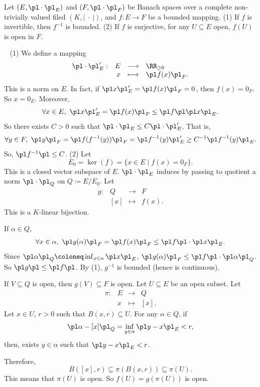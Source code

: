 \begin{propositionenv}
    Let $(E,\pl\cdot\pl_E)$ and $(F,\pl\cdot\pl_F)$ be Banach spaces over a complete non-trivially valued filed $(K,\left|\ \cdot\ \right|)$, and $f:E\longrightarrow F$ be a bounded mapping.
    \newline
    (1) If $f$ is invertible, then $f^{-1}$ is bounded.
    \newline
    (2) If $f$ is surjective, for any $U\subseteq E$ open, $f(U)$ is open in $F$.
\end{propositionenv}
\begin{proofenv}
    \ \newline
    (1) We define a mapping 
    $$\begin{array}{rrcl}
        \pl\cdot\pl_E':& E&\longrightarrow& \RR_{\ge 0}\\
        & x&\longmapsto& \pl f(x)\pl_{F}.
    \end{array}$$
    This is a norm on $E$. In fact, if $\pl x\pl_E'=\pl f(x)\pl_F=0$, then $f(x)=0_F$. So $x=0_E$. Moreover, 
    $$\forall x\in E,\ \pl x\pl'_E=\pl f(x)\pl_F\le \pl f\pl \pl x\pl_E.$$
    So there exists $C>0$ such that $\pl\cdot\pl_E\le C\pl \cdot\pl'_E$. That is, 
    $$ \forall y\in F,\ \pl y\pl_F=\pl f(f^{-1}(y))\pl_F=\pl f^{-1}(y)\pl'_E\ge C^{-1}\pl f^{-1}(y)\pl_E.$$
    So, $\pl f^{-1}\pl \le C$.
    \newline
    (2) Let 
    $$ E_0=\ker(f)=\{x\in E\mid f(x)=0_F\}.$$
    This is a closed vector subspace of $E$. 
    $\pl\cdot\pl_E$ induces by passing to quotient a norm $\pl\cdot\pl_Q$ on $Q\coloneq E/E_0$.
    Let 
    $$\begin{array}{rrcl}
        g:& Q&\longrightarrow& F\\
        &[x]&\longmapsto & f(x).
    \end{array} $$
    This is a $K$-linear bijection.

    \quad If $\alpha \in Q$, 
    $$\forall x\in \alpha,\ \pl g(\alpha)\pl_F=\pl f(x)\pl_F\le \pl f\pl \cdot\pl x\pl_E. $$
    Since $\pl \alpha\pl_Q\coloneq \inf_{x\in \alpha}\pl x\pl_E$, $\pl g(\alpha)\pl_F\le \pl f\pl\cdot\pl \alpha\pl_Q$.
    So $\pl g \pl\le \pl f\pl$. By (1), $g^{-1}$ is bounded (hence is continuous).

    \quad If $V\subseteq Q$ is open, then $g(V)\subseteq F$ is open. 
    Let $U\subseteq E$ be an open subset. Let 
    $$\begin{array}{rrcl}
        \pi:& E &\longrightarrow& Q\\
        & x&\longmapsto &[x].
    \end{array}$$
    Let $x\in U$, $r>0$ such that $B(x,r)\subseteq U$. For any $\alpha\in Q$, if 
    $$ \pl \alpha-[x]\pl_Q=\inf_{y\in \alpha} \pl y-x\pl_E<r,$$
    then, exists $y\in \alpha$ such that $\pl y-x\pl_E<r$.

    Therefore, 
    $$ B([x],r)\subseteq\pi(B(x,r))\subseteq \pi (U).$$
    This means that $\pi (U)$ is open. So $f(U)=g(\pi(U))$ is open.
\end{proofenv}

